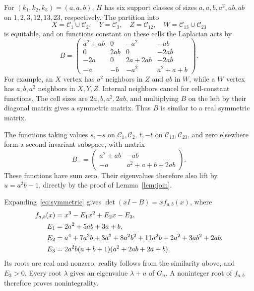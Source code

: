 For $(k_1,k_2,k_3)=(a,a,b)$, $H$ has six support classes of sizes
$a,a,b,a^2,ab,ab$ on $1,2,3,12,13,23$, respectively. The partition into
\[
X=\mathcal C_1\cup\mathcal C_2,\quad Y=\mathcal C_3,\quad
Z=\mathcal C_{12},\quad W=\mathcal C_{13}\cup\mathcal C_{23}
\]
is equitable, and on functions constant on these cells the Laplacian acts by
\begin{equation}
\label{eq:symmetric}
B=\begin{pmatrix}
a^2+ab&0&-a^2&-ab\\
0&2ab&0&-2ab\\
-2a&0&2a+2ab&-2ab\\
-a&-b&-a^2&a^2+a+b
\end{pmatrix}.
\end{equation}
For example, an $X$ vertex has $a^2$ neighbors in $Z$ and $ab$ in $W$,
while a $W$ vertex has $a,b,a^2$ neighbors in $X,Y,Z$.
Internal neighbors cancel for cell-constant functions. The cell sizes are
$2a,b,a^2,2ab$, and multiplying $B$ on the left by their diagonal matrix
gives a symmetric matrix. Thus $B$ is similar to a real symmetric matrix.

The functions taking values $s,-s$ on $\mathcal C_1,\mathcal C_2$,
$t,-t$ on $\mathcal C_{13},\mathcal C_{23}$, and zero elsewhere
form a second invariant subspace, with matrix
\begin{equation}
\label{eq:antisymmetric}
B_-=\begin{pmatrix}a^2+ab&-ab\\-a&a^2+a+b+2ab\end{pmatrix}.
\end{equation}
These functions have sum zero. Their eigenvalues therefore also lift by
$u=a^2b-1$, directly by the proof of Lemma~\ref{lem:join}.

Expanding~\eqref{eq:symmetric} gives $\det(xI-B)=x f_{a,b}(x)$, where
\begin{align}
f_{a,b}(x)&=x^3-E_1x^2+E_2x-E_3,\label{eq:cubic}\\
E_1&=2a^2+5ab+3a+b,\notag\\
E_2&=a^4+7a^3b+3a^3+8a^2b^2+11a^2b+2a^2+3ab^2+2ab,\notag\\
E_3&=2a^2b(a+b+1)(a^2+2ab+2a+b).\notag
\end{align}
Its roots are real and nonzero: reality follows from the similarity above,
and $E_3>0$. Every root $\lambda$ gives an eigenvalue $\lambda+u$ of
$G_n$. A noninteger root of $f_{a,b}$ therefore proves nonintegrality.
